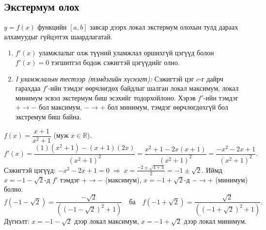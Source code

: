 \subsection{Экстермум олох}
$y=f(x)$ функцийн $[a,b]$ завсар дээрх локал экстермум олохын тулд дараах алхамуудыг гүйцэтгэх шаардлагатай.
\begin{enumerate}
  \item $f'(x)$ уламжлалыг олж түүний уламжлал оршихгүй цэгүүд болон $f'(x)=0$ тэгшитгэл бодож сэжигтэй цэгүүдийг олно. 
  \item \textit{I уламжлалын тестээр (тэмдэгийн хүснэгт):} Сэжигтэй цэг $c$-г дайрч гарахдаа $f'$-ийн тэмдэг өөрчлөгдөх байдлыг шалган локал максимум, локал минимум эсвэл экстермум биш эсэхийг тодорхойлоно. Хэрэв  $f'$-ийн тэмдэг $+\to -$ бол максимум, $-\to +$ бол минимум, тэмдэг өөрчлөгдөхгүй бол экстремум биш байна.
\end{enumerate}  
\begin{example}
$f(x)=\dfrac{x+1}{x^2+1}$ \quad (муж $x\in\mathbb{R}$).
\[
f'(x)=\frac{(1)(x^2+1)-(x+1)(2x)}{(x^2+1)^2}
=\frac{x^2+1-2x(x+1)}{(x^2+1)^2}
=\frac{-x^2-2x+1}{(x^2+1)^2}.
\]
Сэжигтэй цэгүүд: $-x^2-2x+1=0 \;\Rightarrow\; x=\frac{-2\pm\sqrt{4+4}}{2}=-1\pm\sqrt{2}$.
Иймд $x=-1-\sqrt2$-д $f'$ тэмдэг $+\to -$ (максимум), $x=-1+\sqrt2$-д $-\to +$ (минимум) болно.
\[
f(-1-\sqrt2)=\frac{-\sqrt2}{( (-1-\sqrt2)^2+1)} \quad\text{ба}\quad
f(-1+\sqrt2)=\frac{\sqrt2}{( (-1+\sqrt2)^2+1)}.
\]
Дүгнэлт: $x=-1-\sqrt2$ дээр локал максимум, $x=-1+\sqrt2$ дээр локал минимум.
\end{example}

